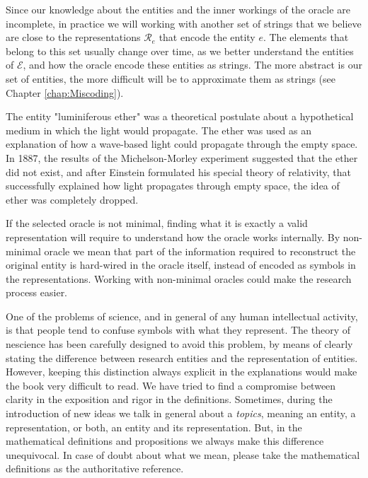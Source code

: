 Since our knowledge about the entities and the inner workings of the oracle are incomplete, in practice we will working with another set of strings that we believe are close to the representations $\mathcal{R}_e$ that encode the entity $e$. The elements that belong to this set usually change over time, as we better understand the entities of $\mathcal{E}$, and how the oracle encode these entities as strings. The more abstract is our set of entities, the more difficult will be to approximate them as strings (see Chapter \ref{chap:Miscoding}).

\begin{example}
\label{ex:luminiferous_ether}
The entity "luminiferous ether" was a theoretical postulate about a hypothetical medium in which the light would propagate. The ether was used as an explanation of how a wave-based light could propagate through the empty space. In 1887, the results of the Michelson-Morley experiment suggested that the ether did not exist, and after Einstein formulated his special theory of relativity, that successfully explained how light propagates through empty space, the idea of ether was completely dropped.
\end{example}

If the selected oracle is not minimal, finding what it is exactly a valid representation will require to understand how the oracle works internally. By non-minimal oracle we mean that part of the information required to reconstruct the original entity is hard-wired in the oracle itself, instead of encoded as symbols in the representations. Working with non-minimal oracles could make the research process easier.

\begin{remark}
One of the problems of science, and in general of any human intellectual activity, is that people tend to confuse symbols with what they represent. The theory of nescience has been carefully designed to avoid this problem, by means of clearly stating the difference between research entities and the representation of entities. However, keeping this distinction always explicit in the explanations would make the book very difficult to read. We have tried to find a compromise between clarity in the exposition and rigor in the definitions. Sometimes, during the introduction of new ideas we talk in general about a \emph{topics}, meaning an entity, a representation, or both, an entity and its representation. But, in the mathematical definitions and propositions we always make this difference unequivocal. In case of doubt about what we mean, please take the mathematical definitions as the authoritative reference. 
\end{remark}

